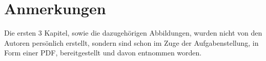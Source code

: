 \documentclass[11pt,ngerman]{scrartcl}
\begin{document}
\section{Anmerkungen}

Die ersten 3 Kapitel, sowie die dazugehörigen Abbildungen, wurden nicht von den
Autoren persönlich erstellt, sondern sind schon im Zuge der Aufgabenstellung,
in Form einer PDF, bereitgestellt und davon entnommen worden. \cite{vorlagehalbschatten}


\newpage

\printbibliography
\listoffigures
\listoftables
\end{document}
